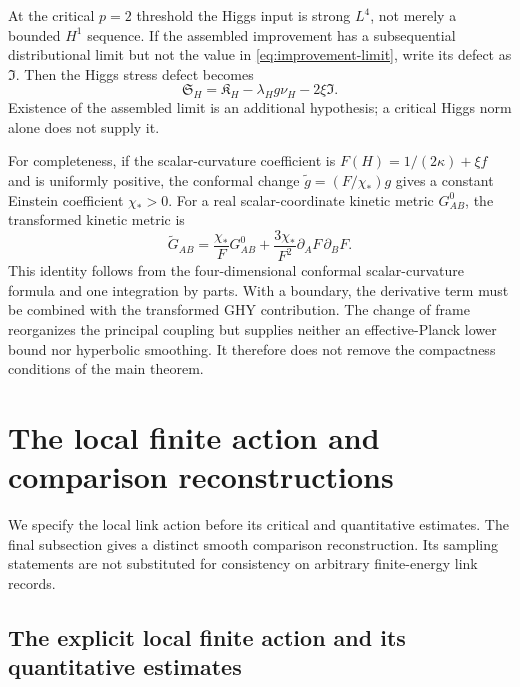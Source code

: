 \documentclass[11pt]{article}
\numberwithin{equation}{section}
\theoremstyle{definition}
\theoremstyle{remark}
\newcommand{\wt}{\widetilde}
\begin{document}
At the critical $p=2$ threshold the Higgs input is strong $L^4$, not merely a bounded $H^1$ sequence. If the assembled improvement has a subsequential distributional limit but not the value in \eqref{eq:improvement-limit}, write its defect as $\mathfrak I$. Then the Higgs stress defect becomes
\begin{equation}
 \mathfrak S_H=\mathfrak K_H-\lambda_Hg\nu_H-2\xi\mathfrak I.
 \label{eq:improved-defect}
\end{equation}
Existence of the assembled limit is an additional hypothesis; a critical Higgs norm alone does not supply it.

For completeness, if the scalar-curvature coefficient is
$F(H)=1/(2\kappa)+\xi f$ and is uniformly positive, the conformal change $\wt g=(F/\chi_*)g$ gives a constant Einstein coefficient $\chi_*>0$. For a real scalar-coordinate kinetic metric $G^0_{AB}$, the transformed kinetic metric is
\[
 \wt G_{AB}=\frac{\chi_*}{F}G^0_{AB}
             +\frac{3\chi_*}{F^2}\partial_AF\,\partial_BF.
\]
This identity follows from the four-dimensional conformal scalar-curvature formula and one integration by parts. With a boundary, the derivative term must be combined with the transformed GHY contribution. The change of frame reorganizes the principal coupling but supplies neither an effective-Planck lower bound nor hyperbolic smoothing. It therefore does not remove the compactness conditions of the main theorem.

\section{The local finite action and comparison reconstructions}
\label{app:local-realization}

We specify the local link action before its critical and quantitative
estimates. The final subsection gives a distinct smooth comparison
reconstruction. Its sampling statements are not substituted for consistency
on arbitrary finite-energy link records.

\subsection{The explicit local finite action and its quantitative estimates}
\label{app:native-action}
\end{document}

